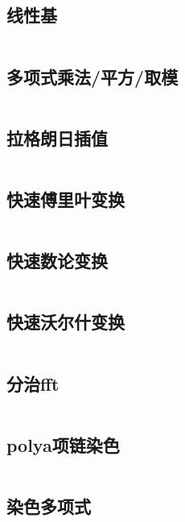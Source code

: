 \inputminted{cpp}{code/矩阵快速幂.cc}

\subsection{	线性基} 

\inputminted{cpp}{code/线性基.cc}

\subsection{多项式乘法/平方/取模} 

\inputminted{cpp}{code/fft_namespace.cc}

\subsection{拉格朗日插值} 

\inputminted{cpp}{code/拉格朗日插值.cc}

\subsection{快速傅里叶变换} 

\inputminted{cpp}{code/fft.cc}

\subsection{快速数论变换} 

\inputminted{cpp}{code/ntt.cc}

\subsection{快速沃尔什变换} 

\inputminted{cpp}{code/fwt.cc}

\subsection{分治fft} 

\inputminted{cpp}{code/CDQfft.cc}

\subsection{polya项链染色} 

\inputminted{cpp}{code/polya_necklace.cc}

\subsection{染色多项式} 

